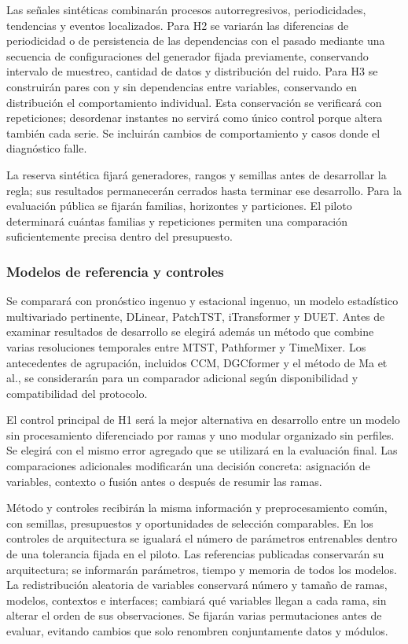 \documentclass[11pt,letterpaper]{article}
\begin{document}
Las señales sintéticas combinarán procesos autorregresivos, periodicidades, tendencias y eventos localizados. Para H2 se variarán las diferencias de periodicidad o de persistencia de las dependencias con el pasado mediante una secuencia de configuraciones del generador fijada previamente, conservando intervalo de muestreo, cantidad de datos y distribución del ruido. Para H3 se construirán pares con y sin dependencias entre variables, conservando en distribución el comportamiento individual. Esta conservación se verificará con repeticiones; desordenar instantes no servirá como único control porque altera también cada serie. Se incluirán cambios de comportamiento y casos donde el diagnóstico falle.

La reserva sintética fijará generadores, rangos y semillas antes de desarrollar la regla; sus resultados permanecerán cerrados hasta terminar ese desarrollo. Para la evaluación pública se fijarán familias, horizontes y particiones. El piloto determinará cuántas familias y repeticiones permiten una comparación suficientemente precisa dentro del presupuesto.

\subsubsection{Modelos de referencia y controles}

Se comparará con pronóstico ingenuo y estacional ingenuo, un modelo estadístico multivariado pertinente, DLinear, PatchTST, iTransformer y DUET. Antes de examinar resultados de desarrollo se elegirá además un método que combine varias resoluciones temporales entre MTST, Pathformer y TimeMixer. Los antecedentes de agrupación, incluidos CCM, DGCformer y el método de Ma et al., se considerarán para un comparador adicional según disponibilidad y compatibilidad del protocolo.

El control principal de H1 será la mejor alternativa en desarrollo entre un modelo sin procesamiento diferenciado por ramas y uno modular organizado sin perfiles. Se elegirá con el mismo error agregado que se utilizará en la evaluación final. Las comparaciones adicionales modificarán una decisión concreta: asignación de variables, contexto o fusión antes o después de resumir las ramas.

Método y controles recibirán la misma información y preprocesamiento común, con semillas, presupuestos y oportunidades de selección comparables. En los controles de arquitectura se igualará el número de parámetros entrenables dentro de una tolerancia fijada en el piloto. Las referencias publicadas conservarán su arquitectura; se informarán parámetros, tiempo y memoria de todos los modelos. La redistribución aleatoria de variables conservará número y tamaño de ramas, modelos, contextos e interfaces; cambiará qué variables llegan a cada rama, sin alterar el orden de sus observaciones. Se fijarán varias permutaciones antes de evaluar, evitando cambios que solo renombren conjuntamente datos y módulos.
\end{document}
